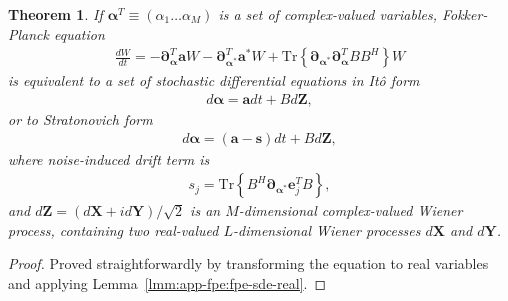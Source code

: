 \documentclass[12pt,aip,jmp,amssymb,amsmath]{revtex4-1}
\newtheorem{theorem}{Theorem}
\begin{document}
\begin{theorem}
\label{thm:app-fpe:fpe-sde-complex}
    If $\boldsymbol{\alpha}^T \equiv (\alpha_1 \ldots \alpha_M)$ is a set of complex-valued variables,
    Fokker-Planck equation
    \begin{eqnarray*}
        \frac{dW}{dt}
        = -\boldsymbol{\partial}_{\boldsymbol{\alpha}}^T \boldsymbol{a} W - \boldsymbol{\partial}_{\boldsymbol{\alpha}^*}^T \boldsymbol{a}^* W
        + \mathrm{Tr} \left\{ \boldsymbol{\partial}_{\boldsymbol{\alpha}^*} \boldsymbol{\partial}_{\boldsymbol{\alpha}}^T B B^H \right\} W
    \end{eqnarray*}
    is equivalent to a set of stochastic differential equations in It\^{o} form
    \begin{eqnarray*}
        d\boldsymbol{\alpha} = \boldsymbol{a} dt + B d\boldsymbol{Z},
    \end{eqnarray*}
    or to Stratonovich form
    \begin{eqnarray*}
        d\boldsymbol{\alpha} = (\boldsymbol{a} - \boldsymbol{s}) dt + B d\boldsymbol{Z},
    \end{eqnarray*}
    where noise-induced drift term is
    \begin{eqnarray*}
        s_j = \mathrm{Tr} \left\{ B^H \boldsymbol{\partial}_{\boldsymbol{\alpha}^*} \boldsymbol{e}_j^T B \right\},
    \end{eqnarray*}
    and $d\boldsymbol{Z} = (d\boldsymbol{X} + id\boldsymbol{Y}) / \sqrt{2}$ is an $M$-dimensional complex-valued Wiener process,
    containing two real-valued $L$-dimensional Wiener processes $d\boldsymbol{X}$ and $d\boldsymbol{Y}$.
\end{theorem}
\begin{proof}
Proved straightforwardly by transforming the equation to real variables and applying Lemma~\ref{lmm:app-fpe:fpe-sde-real}.
\end{proof}
\end{document}
